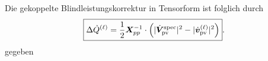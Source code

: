 Die gekoppelte Blindleistungskorrektur in Tensorform ist folglich durch
\begin{equation}
	\boxed{
		\Delta\dot{{Q}}^{(\ell)}
		=
		\frac{1}{2}
		\boldsymbol{X}_{pp}^{-1}
		\cdot
		\left(
		|\dot{\boldsymbol{V}}_{\mathrm{pv}}^{\mathrm{spec}}|^2
		-
		|\dot{\boldsymbol{v}}_{\mathrm{pv}}^{(\ell)}|^2
		\right)
	}.
	\label{eq:dense_coupled_Q}
\end{equation}
gegeben



%
%

